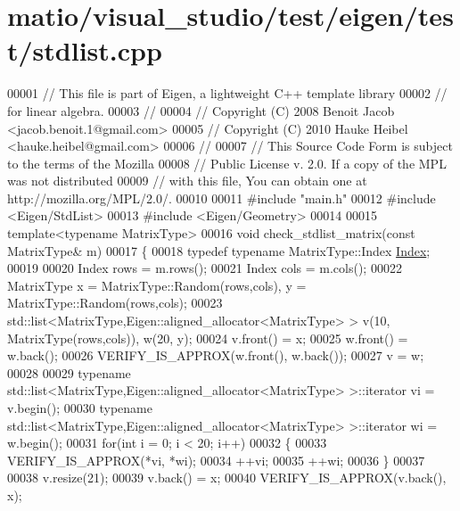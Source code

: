 \hypertarget{matio_2visual__studio_2test_2eigen_2test_2stdlist_8cpp_source}{}\section{matio/visual\+\_\+studio/test/eigen/test/stdlist.cpp}
\label{matio_2visual__studio_2test_2eigen_2test_2stdlist_8cpp_source}

\begin{DoxyCode}
00001 \textcolor{comment}{// This file is part of Eigen, a lightweight C++ template library}
00002 \textcolor{comment}{// for linear algebra.}
00003 \textcolor{comment}{//}
00004 \textcolor{comment}{// Copyright (C) 2008 Benoit Jacob <jacob.benoit.1@gmail.com>}
00005 \textcolor{comment}{// Copyright (C) 2010 Hauke Heibel <hauke.heibel@gmail.com>}
00006 \textcolor{comment}{//}
00007 \textcolor{comment}{// This Source Code Form is subject to the terms of the Mozilla}
00008 \textcolor{comment}{// Public License v. 2.0. If a copy of the MPL was not distributed}
00009 \textcolor{comment}{// with this file, You can obtain one at http://mozilla.org/MPL/2.0/.}
00010 
00011 \textcolor{preprocessor}{#include "main.h"}
00012 \textcolor{preprocessor}{#include <Eigen/StdList>}
00013 \textcolor{preprocessor}{#include <Eigen/Geometry>}
00014 
00015 \textcolor{keyword}{template}<\textcolor{keyword}{typename} MatrixType>
00016 \textcolor{keywordtype}{void} check\_stdlist\_matrix(\textcolor{keyword}{const} MatrixType& m)
00017 \{
00018   \textcolor{keyword}{typedef} \textcolor{keyword}{typename} MatrixType::Index \hyperlink{namespace_eigen_a62e77e0933482dafde8fe197d9a2cfde}{Index};
00019   
00020   Index rows = m.rows();
00021   Index cols = m.cols();
00022   MatrixType x = MatrixType::Random(rows,cols), y = MatrixType::Random(rows,cols);
00023   std::list<MatrixType,Eigen::aligned\_allocator<MatrixType> > v(10, MatrixType(rows,cols)), w(20, y);
00024   v.front() = x;
00025   w.front() = w.back();
00026   VERIFY\_IS\_APPROX(w.front(), w.back());
00027   v = w;
00028 
00029   \textcolor{keyword}{typename} std::list<MatrixType,Eigen::aligned\_allocator<MatrixType> >::iterator vi = v.begin();
00030   \textcolor{keyword}{typename} std::list<MatrixType,Eigen::aligned\_allocator<MatrixType> >::iterator wi = w.begin();
00031   \textcolor{keywordflow}{for}(\textcolor{keywordtype}{int} i = 0; i < 20; i++)
00032   \{
00033     VERIFY\_IS\_APPROX(*vi, *wi);
00034     ++vi;
00035     ++wi;
00036   \}
00037 
00038   v.resize(21);  
00039   v.back() = x;
00040   VERIFY\_IS\_APPROX(v.back(), x);

\end{DoxyCode}
